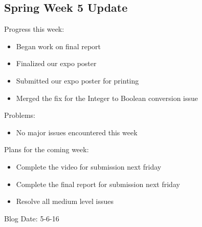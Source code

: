 \subsection{Spring Week 5 Update}
Progress this week:
\begin{itemize}
   \item Began work on final report
   \item Finalized our expo poster
   \item Submitted our expo poster for printing
   \item Merged the fix for the Integer to Boolean conversion issue
\end{itemize}
Problems:
\begin{itemize}
   \item No major issues encountered this week
\end{itemize}
Plans for the coming week:
\begin{itemize}
   \item Complete the video for submission next friday
   \item Complete the final report for submission next friday
   \item Resolve all medium level issues
\end{itemize}
Blog Date: 5-6-16

